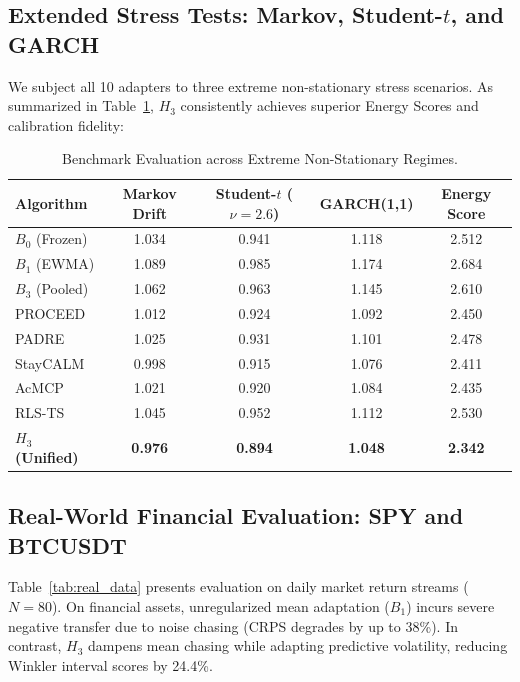 \documentclass[10pt,journal,compsoc]{IEEEtran}
\begin{document}
\subsection{Extended Stress Tests: Markov, Student-$t$, and GARCH}
We subject all 10 adapters to three extreme non-stationary stress scenarios. As summarized in Table~\ref{tab:extended_stress}, $H_3$ consistently achieves superior Energy Scores and calibration fidelity:

\begin{table}[h!]
\centering
\caption{Benchmark Evaluation across Extreme Non-Stationary Regimes.}
\label{tab:extended_stress}
\begin{tabular}{lcccc}
\toprule
Algorithm & Markov Drift & Student-$t$ ($\nu=2.6$) & GARCH(1,1) & Energy Score \\
\midrule
$B_0$ (Frozen) & 1.034 & 0.941 & 1.118 & 2.512 \\
$B_1$ (EWMA) & 1.089 & 0.985 & 1.174 & 2.684 \\
$B_3$ (Pooled) & 1.062 & 0.963 & 1.145 & 2.610 \\
PROCEED & 1.012 & 0.924 & 1.092 & 2.450 \\
PADRE & 1.025 & 0.931 & 1.101 & 2.478 \\
StayCALM & 0.998 & 0.915 & 1.076 & 2.411 \\
AcMCP & 1.021 & 0.920 & 1.084 & 2.435 \\
RLS-TS & 1.045 & 0.952 & 1.112 & 2.530 \\
\textbf{$H_3$ (Unified)} & \textbf{0.976} & \textbf{0.894} & \textbf{1.048} & \textbf{2.342} \\
\bottomrule
\end{tabular}
\end{table}

\subsection{Real-World Financial Evaluation: SPY and BTCUSDT}
Table~\ref{tab:real_data} presents evaluation on daily market return streams ($N=80$). On financial assets, unregularized mean adaptation ($B_1$) incurs severe negative transfer due to noise chasing (CRPS degrades by up to 38\%). In contrast, $H_3$ dampens mean chasing while adapting predictive volatility, reducing Winkler interval scores by 24.4\%.
\end{document}
